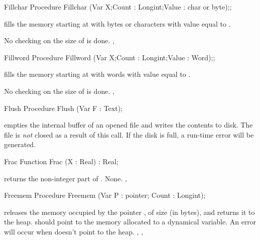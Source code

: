 \documentclass{report}
\begin{document}

\begin{procedure}{Fillchar}
\Declaration
Procedure Fillchar (Var X;Count : Longint;Value : char or byte);;

\Description
{} fills the memory starting at  with  bytes
or characters with value equal to .

\Errors
No checking on the size of  is done.
\SeeAlso
{}, 
\end{procedure}


\begin{procedure}{Fillword}
\Declaration
Procedure Fillword (Var X;Count : Longint;Value : Word);;

\Description
{} fills the memory starting at  with  words
with value equal to .

\Errors
No checking on the size of  is done.
\SeeAlso
{}, 
\end{procedure}


\begin{procedure}{Flush}
\Declaration
Procedure Flush (Var F : Text);

\Description
{} empties the internal buffer of an opened file  and writes the
contents to disk. The file is \textit{not} closed as a result of this call.
\Errors
If the disk is full, a run-time error will be generated.
\SeeAlso
{}
\end{procedure}


\begin{function}{Frac}
\Declaration
Function Frac (X : Real) : Real;

\Description
{} returns the non-integer part of .
\Errors
None.
\SeeAlso
{}, 
\end{function}


\begin{procedure}{Freemem}
\Declaration
Procedure Freemem (Var P : pointer; Count : Longint);

\Description
{} releases the memory occupied by the pointer , of size
 (in bytes), and returns it to the heap.  should point to the memory
allocated to a dynamical variable.
\Errors
An error will occur when  doesn't point to the heap.
\SeeAlso
{}, , 
\end{procedure}
\end{document}
